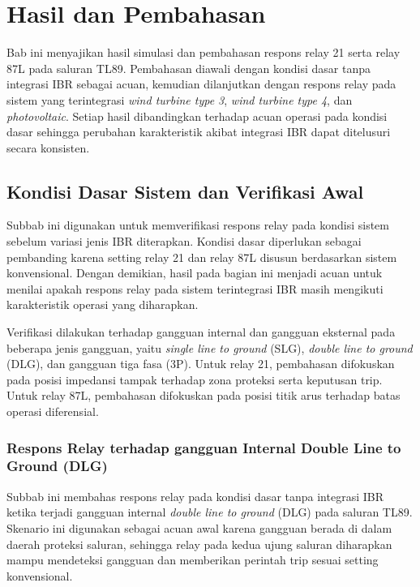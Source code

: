﻿%
\chapter{Hasil dan Pembahasan}

Bab ini menyajikan hasil simulasi dan pembahasan respons relay 21 serta relay 87L pada saluran TL89. Pembahasan diawali dengan kondisi dasar tanpa integrasi IBR sebagai acuan, kemudian dilanjutkan dengan respons relay pada sistem yang terintegrasi \textit{wind turbine type 3}, \textit{wind turbine type 4}, dan \textit{photovoltaic}. Setiap hasil dibandingkan terhadap acuan operasi pada kondisi dasar sehingga perubahan karakteristik akibat integrasi IBR dapat ditelusuri secara konsisten.

\section{Kondisi Dasar Sistem dan Verifikasi Awal}
\label{sec:kondisi_dasar_sistem}

Subbab ini digunakan untuk memverifikasi respons relay pada kondisi sistem sebelum variasi jenis IBR diterapkan. Kondisi dasar diperlukan sebagai pembanding karena setting relay 21 dan relay 87L disusun berdasarkan sistem konvensional. Dengan demikian, hasil pada bagian ini menjadi acuan untuk menilai apakah respons relay pada sistem terintegrasi IBR masih mengikuti karakteristik operasi yang diharapkan.

Verifikasi dilakukan terhadap gangguan internal dan gangguan eksternal pada beberapa jenis gangguan, yaitu \textit{single line to ground} (SLG), \textit{double line to ground} (DLG), dan gangguan tiga fasa (3P). Untuk relay 21, pembahasan difokuskan pada posisi impedansi tampak terhadap zona proteksi serta keputusan trip. Untuk relay 87L, pembahasan difokuskan pada posisi titik arus terhadap batas operasi diferensial.

\subsection{Respons Relay terhadap gangguan Internal Double Line to Ground (DLG)}
\label{subsec:tanpa_IBR_in_dlg}

Subbab ini membahas respons relay pada kondisi dasar tanpa integrasi IBR ketika terjadi gangguan internal \textit{double line to ground} (DLG) pada saluran TL89. Skenario ini digunakan sebagai acuan awal karena gangguan berada di dalam daerah proteksi saluran, sehingga relay pada kedua ujung saluran diharapkan mampu mendeteksi gangguan dan memberikan perintah trip sesuai setting konvensional.

